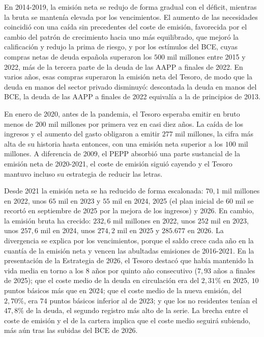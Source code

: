 \documentclass[10pt,a4paper]{article}
\begin{document}
En 2014-2019, la emisión neta se redujo de forma gradual con el déficit, mientras la bruta se mantenía elevada por los vencimientos. El aumento de las necesidades coincidió con una caída sin precedentes del coste de emisión, favorecida por el cambio del patrón de crecimiento hacia uno más equilibrado, que mejoró la calificación y redujo la prima de riesgo, y por los estímulos del BCE, cuyas compras netas de deuda española superaron los $500$ mil millones entre 2015 y 2022, más de la tercera parte de la deuda de las AAPP a finales de 2022. En varios años, esas compras superaron la emisión neta del Tesoro, de modo que la deuda en manos del sector privado disminuyó: descontada la deuda en manos del BCE, la deuda de las AAPP a finales de 2022 equivalía a la de principios de 2013.

En enero de 2020, antes de la pandemia, el Tesoro esperaba emitir en bruto menos de $200$ mil millones por primera vez en casi diez años. La caída de los ingresos y el aumento del gasto obligaron a emitir $277$ mil millones, la cifra más alta de su historia hasta entonces, con una emisión neta superior a los $100$ mil millones. A diferencia de 2009, el PEPP absorbió una parte sustancial de la emisión neta de 2020-2021, el coste de emisión siguió cayendo y el Tesoro mantuvo incluso su estrategia de reducir las letras.

Desde 2021 la emisión neta se ha reducido de forma escalonada: $70,1$ mil millones en 2022, unos $65$ mil en 2023 y $55$ mil en 2024, 2025 (el plan inicial de $60$ mil se recortó en septiembre de 2025 por la mejora de los ingresos) y 2026. En cambio, la emisión bruta ha crecido: $232,6$ mil millones en 2022, unos $252$ mil en 2023, unos $257,6$ mil en 2024, unos $274,2$ mil en 2025 y $285{.}677$ en 2026. La divergencia se explica por los vencimientos, porque el saldo crece cada año en la cuantía de la emisión neta y vencen las abultadas emisiones de 2016-2021. En la presentación de la Estrategia de 2026, el Tesoro destacó que había mantenido la vida media en torno a los $8$ años por quinto año consecutivo ($7,93$ años a finales de 2025); que el coste medio de la deuda en circulación era del $2,31\%$ en 2025, $10$ puntos básicos más que en 2024; que el coste medio de la nueva emisión, del $2,70\%$, era $74$ puntos básicos inferior al de 2023; y que los no residentes tenían el $47,8\%$ de la deuda, el segundo registro más alto de la serie. La brecha entre el coste de emisión y el de la cartera implica que el coste medio seguirá subiendo, más aún tras las subidas del BCE de 2026.
\end{document}
